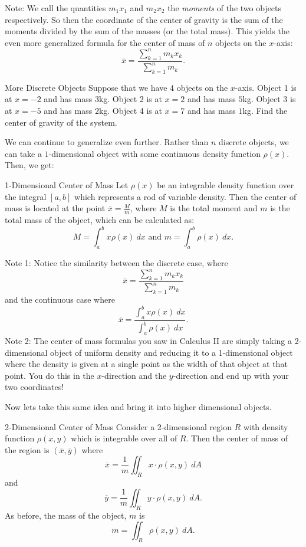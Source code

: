 Note: We call the quantities $m_1x_1$ and $m_2x_2$ the \textit{moments} of the two objects respectively. So then the coordinate of the center of gravity is the sum of the moments divided by the sum of the masses (or the total mass). This yields the even more generalized formula for the center of mass of $n$ objects on the $x$-axis:
$$\overline{x}=\frac{\sum_{k=1}^{n}m_kx_k }{\sum_{k=1}^{n}m_k}.$$

\begin{exercise}{More Discrete Objects}
Suppose that we have 4 objects on the $x$-axis. Object 1 is at $x=-2$ and has mass $3$kg. Object 2 is at $x=2$ and has mass $5$kg. Object 3 is at $x=-5$ and has mass $2$kg. Object 4 is at $x=7$ and has mass $1$kg. Find the center of gravity of the system.
\end{exercise}

We can continue to generalize even further. Rather than $n$ discrete objects, we can take a $1$-dimensional object with some continuous density function $\rho(x) $. Then, we get:

\begin{definition}{1-Dimensional Center of Mass}
Let $\rho(x)$ be an integrable density function over the integral $[a,b]$ which represents a rod of variable density. Then the center of mass is located at the point $\overline{x}=\frac{M}{m}$, where $M$ is the total moment and $m$ is the total mass of the object, which can be calculated as:
$$M=\int_a^b x\rho(x)\ dx\text{ and }m=\int_a^{b}\rho(x)\ dx.$$
\end{definition}

Note 1: Notice the similarity between the discrete case, where $$\overline{x}=\frac{\displaystyle\sum_{k=1}^{n}m_kx_k }{\displaystyle\sum_{k=1}^{n}m_k} $$ and the continuous case where $$\overline{x}=\frac{\displaystyle\int_{a}^b x\rho(x)\ dx}{\displaystyle\int_a^b\rho(x)\ dx}. $$
Note 2: The center of mass formulas you saw in Calculus II are simply taking a 2-dimensional object of uniform density and reducing it to a 1-dimensional object where the density is given at a single point as the width of that object at that point. You do this in the $x$-direction and the $y$-direction and end up with your two coordinates!

Now lets take this same idea and bring it into higher dimensional objects.

\begin{definition}{2-Dimensional Center of Mass}
Consider a 2-dimensional region $R$ with density function $\rho(x,y)$ which is integrable over all of $R$. Then the center of mass of the region is $(\overline{x},\overline{y})$ where $$\overline{x}=\frac{1}{m}\iint_R x\cdot\rho(x,y) \ dA $$ and $$\overline{y}=\frac{1}{m}\iint_R y\cdot\rho(x,y)\ dA.$$
As before, the mass of the object, $m$ is $$m=\iint_R \rho(x,y)\ dA. $$
\end{definition}

